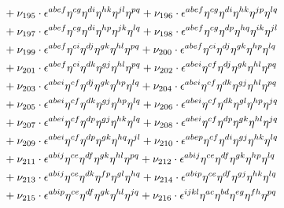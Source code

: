 \documentclass[a4paper,12pt, DIV=14, BCOR=5mm, twoside, headsepline]{scrbook}
\begin{document}
\begin{align}
\begin{alignedat}{2}
& & &\hphantom{=}
+\nu_{195}\cdot\epsilon^{abef}\eta^{cg}\eta^{di}\eta^{hk}\eta^{jl}\eta^{pq}+\nu_{196}\cdot\epsilon^{abef}\eta^{cg}\eta^{di}\eta^{hk}\eta^{jp}\eta^{lq}\\
& & &\hphantom{=}
+\nu_{197}\cdot\epsilon^{abef}\eta^{cg}\eta^{di}\eta^{hp}\eta^{jk}\eta^{lq}+\nu_{198}\cdot\epsilon^{abef}\eta^{cg}\eta^{dp}\eta^{hq}\eta^{ik}\eta^{jl}\\
& & &\hphantom{=}
+\nu_{199}\cdot\epsilon^{abef}\eta^{ci}\eta^{dj}\eta^{gk}\eta^{hl}\eta^{pq}+\nu_{200}\cdot\epsilon^{abef}\eta^{ci}\eta^{dj}\eta^{gk}\eta^{hp}\eta^{lq}\\
& & &\hphantom{=}
+\nu_{201}\cdot\epsilon^{abef}\eta^{ci}\eta^{dk}\eta^{gj}\eta^{hl}\eta^{pq}+\nu_{202}\cdot\epsilon^{abei}\eta^{cf}\eta^{dj}\eta^{gk}\eta^{hl}\eta^{pq}\\
& & &\hphantom{=}
+\nu_{203}\cdot\epsilon^{abei}\eta^{cf}\eta^{dj}\eta^{gk}\eta^{hp}\eta^{lq}+\nu_{204}\cdot\epsilon^{abei}\eta^{cf}\eta^{dk}\eta^{gj}\eta^{hl}\eta^{pq}\\
& & &\hphantom{=}
+\nu_{205}\cdot\epsilon^{abei}\eta^{cf}\eta^{dk}\eta^{gj}\eta^{hp}\eta^{lq}+\nu_{206}\cdot\epsilon^{abei}\eta^{cf}\eta^{dk}\eta^{gl}\eta^{hp}\eta^{jq}\\
& & &\hphantom{=}
+\nu_{207}\cdot\epsilon^{abei}\eta^{cf}\eta^{dp}\eta^{gj}\eta^{hk}\eta^{lq}+\nu_{208}\cdot\epsilon^{abei}\eta^{cf}\eta^{dp}\eta^{gk}\eta^{hl}\eta^{jq}\\
& & &\hphantom{=}
+\nu_{209}\cdot\epsilon^{abei}\eta^{cf}\eta^{dp}\eta^{gk}\eta^{hq}\eta^{jl}+\nu_{210}\cdot\epsilon^{abep}\eta^{cf}\eta^{di}\eta^{gj}\eta^{hk}\eta^{lq}\\
& & &\hphantom{=}
+\nu_{211}\cdot\epsilon^{abij}\eta^{ce}\eta^{df}\eta^{gk}\eta^{hl}\eta^{pq}+\nu_{212}\cdot\epsilon^{abij}\eta^{ce}\eta^{df}\eta^{gk}\eta^{hp}\eta^{lq}\\
& & &\hphantom{=}
+\nu_{213}\cdot\epsilon^{abij}\eta^{ce}\eta^{dk}\eta^{fp}\eta^{gl}\eta^{hq}+\nu_{214}\cdot\epsilon^{abip}\eta^{ce}\eta^{df}\eta^{gj}\eta^{hk}\eta^{lq}\\
& & &\hphantom{=}
+\nu_{215}\cdot\epsilon^{abip}\eta^{ce}\eta^{df}\eta^{gk}\eta^{hl}\eta^{jq}+\nu_{216}\cdot\epsilon^{ijkl}\eta^{ac}\eta^{bd}\eta^{eg}\eta^{fh}\eta^{pq}
\end{alignedat}
\end{align}
\end{document}
